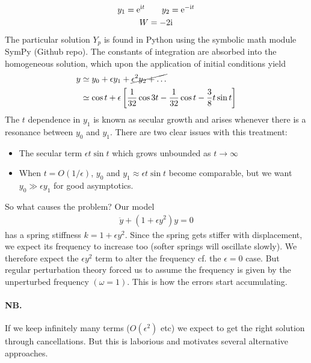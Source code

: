 \begin{gather*}
y_1 = \mathrm{e}^{\mathrm{i} t} \qquad y_2 = \mathrm{e}^{-\mathrm{i} t} \\
W = -2\mathrm{i}
\end{gather*}
The particular solution $Y_p$ is found in Python using the symbolic math module SymPy (Github repo). The constants of integration are absorbed into the homogeneous solution, which upon the application of initial conditions yield   
\begin{align}
y &\simeq y_0 + \epsilon y_1 + \cancel{\epsilon^2 y_2 + \dots} \nonumber \\
&\simeq \cos t + \epsilon \left[\frac{1}{32} \cos 3t - \frac{1}{32} \cos t - \frac{3}{8} t \sin t\right] \label{eqn:duffing-secular}
\end{align}
The $t$ dependence in $y_1$ is known as secular growth and arises whenever there is a resonance between $y_0$ and $y_1$. There are two clear issues with this treatment:
\begin{itemize}
	\item The secular term $\epsilon t \sin t$ which grows unbounded as $t \rightarrow \infty$
	\item When $t=O(1/\epsilon)$, $y_0$ and $y_1\approx \epsilon t \sin t$ become comparable, but we want $y_0 \gg \epsilon y_1$ for good asymptotics. 
\end{itemize}
So what causes the problem? Our model
\begin{gather*}
	\ddot y + (1+\epsilon y^2) y = 0
\end{gather*}
has a spring stiffness $k = 1+\epsilon y^2$. Since the spring gets stiffer with displacement, we expect its frequency to increase too (softer springs will oscillate slowly). We therefore expect the $\epsilon y^2$ term to alter the frequency cf. the $\epsilon=0$ case. But regular perturbation theory forced us to assume the frequency is given by the unperturbed frequency $(\omega=1)$. This is how the errors start accumulating. 

\paragraph{NB.} If we keep infinitely many terms ($O(\epsilon^2)$ etc) we expect to get the right solution through cancellations. But this is laborious and motivates several alternative approaches. 

